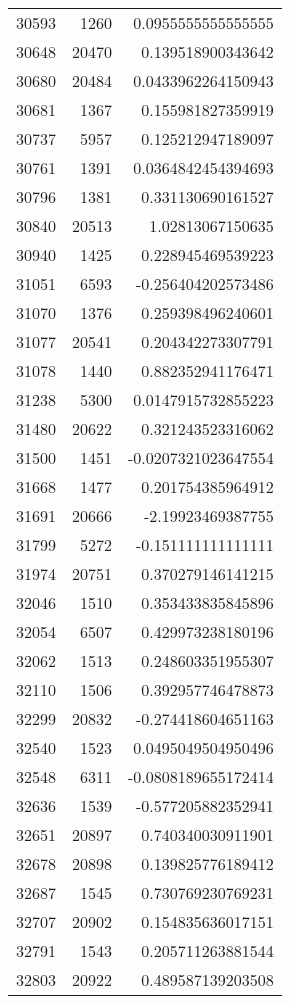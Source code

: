 \begin{tabular}{r | r | r}
30593 & 1260 & 0.0955555555555555 \\
30648 & 20470 & 0.139518900343642 \\
30680 & 20484 & 0.0433962264150943 \\
30681 & 1367 & 0.155981827359919 \\
30737 & 5957 & 0.125212947189097 \\
30761 & 1391 & 0.0364842454394693 \\
30796 & 1381 & 0.331130690161527 \\
30840 & 20513 & 1.02813067150635 \\
30940 & 1425 & 0.228945469539223 \\
31051 & 6593 & -0.256404202573486 \\
31070 & 1376 & 0.259398496240601 \\
31077 & 20541 & 0.204342273307791 \\
31078 & 1440 & 0.882352941176471 \\
31238 & 5300 & 0.0147915732855223 \\
31480 & 20622 & 0.321243523316062 \\
31500 & 1451 & -0.0207321023647554 \\
31668 & 1477 & 0.201754385964912 \\
31691 & 20666 & -2.19923469387755 \\
31799 & 5272 & -0.151111111111111 \\
31974 & 20751 & 0.370279146141215 \\
32046 & 1510 & 0.353433835845896 \\
32054 & 6507 & 0.429973238180196 \\
32062 & 1513 & 0.248603351955307 \\
32110 & 1506 & 0.392957746478873 \\
32299 & 20832 & -0.274418604651163 \\
32540 & 1523 & 0.0495049504950496 \\
32548 & 6311 & -0.0808189655172414 \\
32636 & 1539 & -0.577205882352941 \\
32651 & 20897 & 0.740340030911901 \\
32678 & 20898 & 0.139825776189412 \\
32687 & 1545 & 0.730769230769231 \\
32707 & 20902 & 0.154835636017151 \\
32791 & 1543 & 0.205711263881544 \\
32803 & 20922 & 0.489587139203508 \\

\end{tabular}

